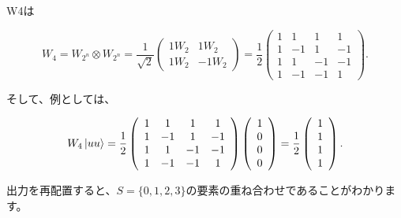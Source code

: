 W4は

\begin{equation}
\label{58}
W_{4} =  W_{2^n} \otimes W_{2^n} = 
\frac{1}{\sqrt{2}}
\left( \begin{array}{ccc}
 1 W_2 & 1 W_2  \\
 1 W_2 & -1 W_2
\end{array} \right)
=
\frac{1}{2}
\left( \begin{array}{cccc}
1 & 1 & 1 & 1  \\
1 & -1 & 1 & -1  \\
1 & 1 & -1 & -1  \\
1 & -1 & -1 & 1  
\end{array} \right).
\end{equation}

そして、例としては、

\begin{equation}
\label{59}
W_{4} \ket{uu}
=
\frac{1}{2}
\left( \begin{array}{cccc}
1 & 1 & 1 & 1  \\
1 & -1 & 1 & -1  \\
1 & 1 & -1 & -1  \\
1 & -1 & -1 & 1  
\end{array} \right)
\left( \begin{array}{ccc}
1  \\
0 \\
0 \\
0
\end{array} \right)
=
\frac{1}{2}
\left( \begin{array}{ccc}
1  \\
1 \\
1 \\
1
\end{array} \right).
\end{equation}

出力を再配置すると、$ S = \{0,1,2,3 \}$の要素の重ね合わせであることがわかります。

